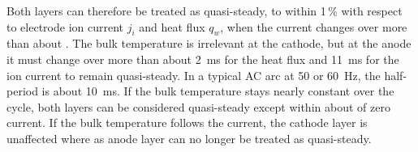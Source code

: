 Both layers can therefore be treated as quasi-steady, to within 1\,\% with respect to electrode ion current \(j_i\) and heat flux \(q_w\), when the current changes over more than about . The bulk temperature is irrelevant at the cathode, but at the anode it must change over more than about 2~ms for the heat flux and 11~ms for the ion current to remain quasi-steady. In a typical AC arc at 50 or 60~Hz, the half-period is about 10~ms. If the bulk temperature stays nearly constant over the cycle, both layers can be considered quasi-steady except within about  of zero current. If the bulk temperature follows the current, the cathode layer is unaffected where as anode layer can no longer be treated as quasi-steady.

